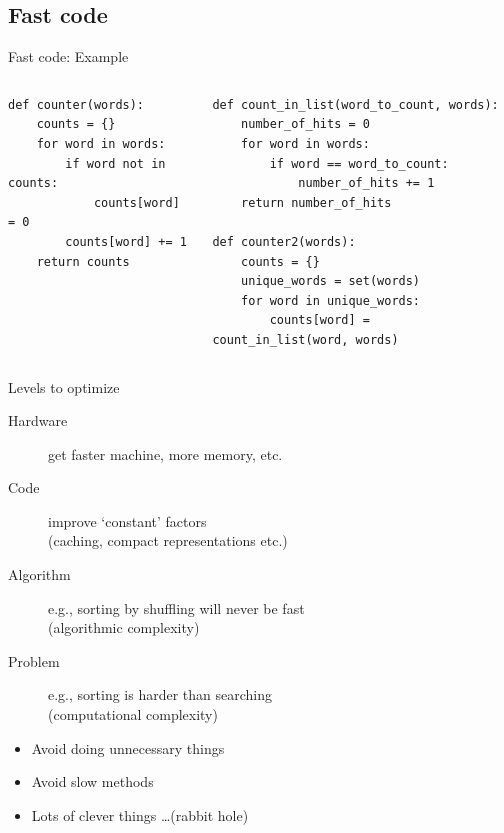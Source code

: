 \documentclass[aspectratio=169,usenames,dvipsnames]{beamer}
\begin{document}
\subsection{Fast code}
\begin{frame}[fragile]{Fast code: Example}
    \begin{columns}[T]
\begin{lstlisting}
def counter(words):
    counts = {}
    for word in words:
        if word not in counts:
            counts[word] = 0
        counts[word] += 1
    return counts
\end{lstlisting}
\begin{lstlisting}
def count_in_list(word_to_count, words):
    number_of_hits = 0
    for word in words:
        if word == word_to_count:
            number_of_hits += 1
    return number_of_hits

def counter2(words):
    counts = {}
    unique_words = set(words)
    for word in unique_words:
        counts[word] = count_in_list(word, words)
\end{lstlisting}
\end{columns}
\end{frame}


\begin{frame}{Levels to optimize}
    \begin{description}
        \item[Hardware] get faster machine, more memory, etc.
        \item[Code] improve `constant' factors \\ (caching, compact representations etc.)
        \item[Algorithm] e.g., sorting by shuffling will never be fast \\ (algorithmic complexity)
        \item[Problem] e.g., sorting is harder than searching \\ (computational complexity)
    \end{description}

    \pause
    \begin{itemize}
        \item Avoid doing unnecessary things
        \item Avoid slow methods
        \item Lots of clever things \dots (rabbit hole)
    \end{itemize}
\end{frame}
\end{document}
